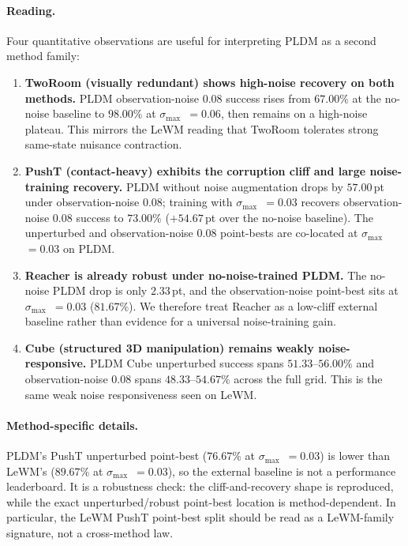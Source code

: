 \documentclass[10pt]{article}
\newcommand{\stdmax}{\ensuremath{\sigma_{\max}}}
\begin{document}
\paragraph{Reading.} Four quantitative observations are useful for interpreting PLDM as a second method family:
\begin{enumerate}
  \item \textbf{TwoRoom (visually redundant) shows high-noise recovery on both methods.} PLDM observation-noise 0.08 success rises from $67.00\%$ at the no-noise baseline to $98.00\%$ at \stdmax{}~$= 0.06$, then remains on a high-noise plateau. This mirrors the LeWM reading that TwoRoom tolerates strong same-state nuisance contraction.
  \item \textbf{PushT (contact-heavy) exhibits the corruption cliff and large noise-training recovery.} PLDM without noise augmentation drops by $57.00$\,pt under observation-noise 0.08; training with \stdmax{}~$= 0.03$ recovers observation-noise 0.08 success to $73.00\%$ ($+54.67$\,pt over the no-noise baseline). The unperturbed and observation-noise 0.08 point-bests are co-located at \stdmax{}~$= 0.03$ on PLDM.
  \item \textbf{Reacher is already robust under no-noise-trained PLDM.} The no-noise PLDM drop is only $2.33$\,pt, and the observation-noise point-best sits at \stdmax{}~$= 0.03$ ($81.67\%$). We therefore treat Reacher as a low-cliff external baseline rather than evidence for a universal noise-training gain.
  \item \textbf{Cube (structured 3D manipulation) remains weakly noise-responsive.} PLDM Cube unperturbed success spans $51.33$--$56.00\%$ and observation-noise 0.08 spans $48.33$--$54.67\%$ across the full grid. This is the same weak noise responsiveness seen on LeWM.
\end{enumerate}

\paragraph{Method-specific details.} PLDM's PushT unperturbed point-best ($76.67\%$ at \stdmax{}~$= 0.03$) is lower than LeWM's ($89.67\%$ at \stdmax{}~$= 0.03$), so the external baseline is not a performance leaderboard. It is a robustness check: the cliff-and-recovery shape is reproduced, while the exact unperturbed/robust point-best location is method-dependent. In particular, the LeWM PushT point-best split should be read as a LeWM-family signature, not a cross-method law.
\end{document}
